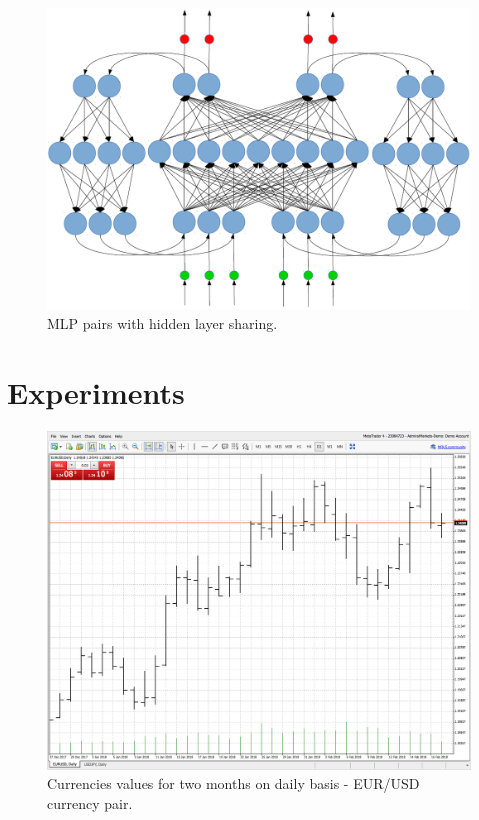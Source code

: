 \documentclass{llncs}
\begin{document}
\begin{figure}
  \includegraphics[width=1.0\linewidth]{fig01}
  \caption{MLP pairs with hidden layer sharing.}
  \label{fig01}
\end{figure}
\FloatBarrier

\section{Experiments} \label{Experiments}

\begin{figure}
  \includegraphics[width=1.0\linewidth]{fig02}
  \caption{Currencies values for two months on daily basis - EUR/USD currency pair.}
  \label{fig02}
\end{figure}
\FloatBarrier
\end{document}
